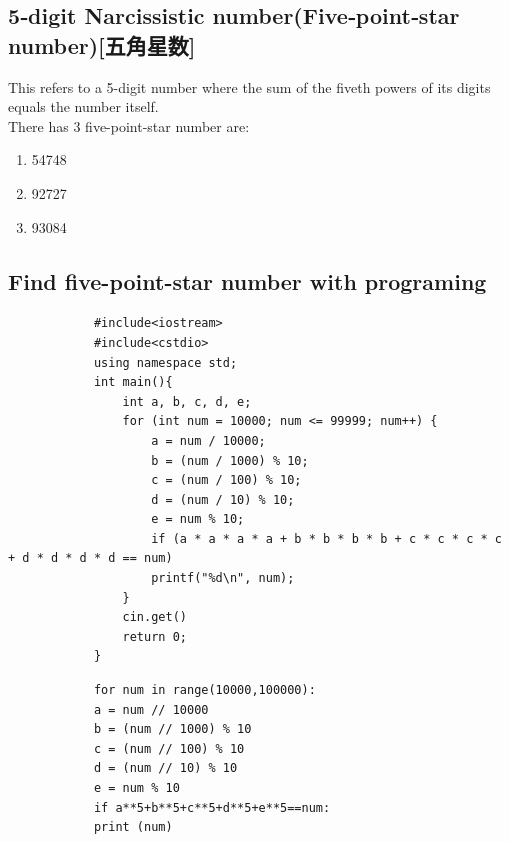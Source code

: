 \documentclass[12pt,a4paper,]{ctexart}
\begin{document}
\begin{flushleft}
		\section{5‑digit Narcissistic number(Five‑point‑star number)[五角星数]}
		This refers to a 5-digit number where the sum of the fiveth powers of its digits equals the number itself.\\
		There has 3 five-point-star number are:
		\begin{enumerate}
			\item 54748
			\item 92727
			\item 93084
		\end{enumerate}
		\subsection{Find five-point-star number with programing}
		\begin{lstlisting}
			#include<iostream>
			#include<cstdio>
			using namespace std;
			int main(){
				int a, b, c, d, e;
				for (int num = 10000; num <= 99999; num++) {
					a = num / 10000;
					b = (num / 1000) % 10;
					c = (num / 100) % 10;
					d = (num / 10) % 10;
					e = num % 10;
					if (a * a * a * a + b * b * b * b + c * c * c * c + d * d * d * d == num)
					printf("%d\n", num);
				}
				cin.get()
				return 0;
			}
		\end{lstlisting}
		\begin{lstlisting}
			for num in range(10000,100000):
			a = num // 10000
			b = (num // 1000) % 10
			c = (num // 100) % 10
			d = (num // 10) % 10
			e = num % 10
			if a**5+b**5+c**5+d**5+e**5==num:
			print (num)
		\end{lstlisting}
	\end{flushleft}
\end{document}
